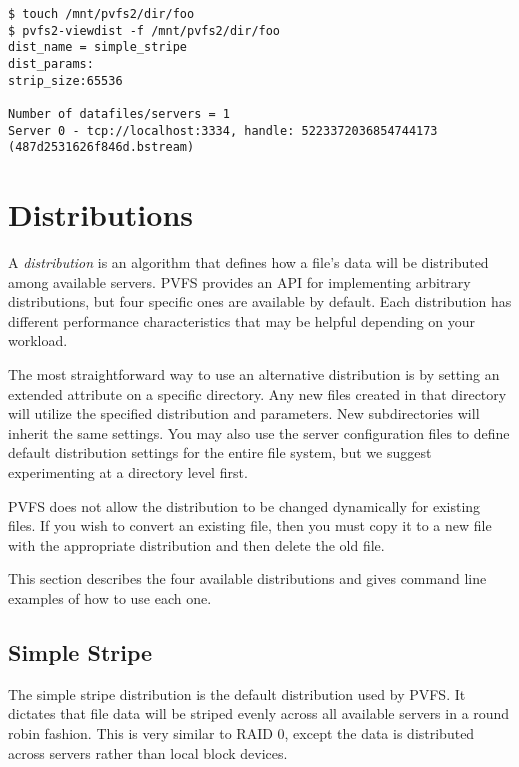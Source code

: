 \documentclass[11pt,letterpaper]{article}
\begin{document}
\begin{verbatim}
$ touch /mnt/pvfs2/dir/foo
$ pvfs2-viewdist -f /mnt/pvfs2/dir/foo
dist_name = simple_stripe
dist_params:
strip_size:65536

Number of datafiles/servers = 1
Server 0 - tcp://localhost:3334, handle: 5223372036854744173
(487d2531626f846d.bstream)
\end{verbatim}

\section{Distributions}

A \emph{distribution} is an algorithm that defines how a file's data
will be distributed among available servers.  PVFS provides an API
for implementing arbitrary distributions, but four specific ones are
available by default.  Each distribution has different performance
characteristics that may be helpful depending on your workload.

The most straightforward way to use an alternative distribution is by
setting an extended attribute on a specific directory.  Any new files
created in that directory will utilize the specified distribution and
parameters.  New subdirectories will inherit the same settings.  You may
also use the server configuration files to define default distribution
settings for the entire file system, but we suggest experimenting at a
directory level first.

PVFS does not allow the distribution to be changed dynamically for
existing files.  If you wish to convert an existing file, then you must
copy it to a new file with the appropriate distribution and then delete
the old file.

This section describes the four available distributions and gives
command line examples of how to use each one.  


\subsection{Simple Stripe}

The simple stripe distribution is the default distribution used by PVFS.
It dictates that file data will be striped evenly across all available
servers in a round robin fashion.  This is very similar to RAID 0,
except the data is distributed across servers rather than local block
devices. 
\end{document}
